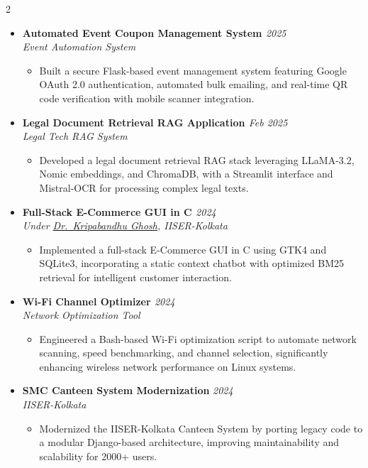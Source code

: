 \documentclass[a4paper,10pt]{article}
\newcommand{\resumeProject}[4]{
    \item\small{
        \textbf{#1} \hfill \textit{#2}\\
        \textit{#3}\\
        \begin{itemize}[leftmargin=1.5em,label=\textbullet,nosep,itemsep=0.5pt]
            #4
        \end{itemize}
    }\vspace{2pt}
}
\begin{document}
{\begin{multicols}{2}
\begin{itemize}[leftmargin=*,label={},itemsep=4pt]
     
    \resumeProject{Automated Event Coupon Management System \href{https://github.com/Shuvam-Banerji-Seal/Automated-Event-Coupon-Sender-Email-and-Verification-Application}{\faGithub}}{2025}
    {Event Automation System}
    {\item Built a secure Flask-based event management system featuring Google OAuth 2.0 authentication, automated bulk emailing, and real-time QR code verification with mobile scanner integration.}
     
    \resumeProject{Legal Document Retrieval RAG Application \href{https://github.com/Shuvam-Banerji-Seal/CCA-2015-LLM}{\faGithub}}{Feb 2025}
    {Legal Tech RAG System}
    {\item Developed a legal document retrieval RAG stack leveraging LLaMA-3.2, Nomic embeddings, and ChromaDB, with a Streamlit interface and Mistral-OCR for processing complex legal texts.}
     
    \resumeProject{Full-Stack E-Commerce GUI in C \href{https://github.com/Shuvam-Banerji-Seal/CS3101-E-Commerce-App-in-C.git}{\faGithub}}{2024}
    {Under \href{https://www.iiserkol.ac.in/web/en/people/faculty/cds/kripaghosh/}{Dr.\ Kripabandhu Ghosh}, IISER-Kolkata}
    {\item Implemented a full-stack E-Commerce GUI in C using GTK4 and SQLite3, incorporating a static context chatbot with optimized BM25 retrieval for intelligent customer interaction.}
     
    \resumeProject{Wi-Fi Channel Optimizer \href{https://github.com/Shuvam-Banerji-Seal/Wi-Fi-channel-optimizer}{\faGithub}}{2024}
    {Network Optimization Tool}
    {\item Engineered a Bash-based Wi-Fi optimization script to automate network scanning, speed benchmarking, and channel selection, significantly enhancing wireless network performance on Linux systems.}
     
    \resumeProject{SMC Canteen System Modernization}{2024}
    {IISER-Kolkata}
    {\item Modernized the IISER-Kolkata Canteen System by porting legacy code to a modular Django-based architecture, improving maintainability and scalability for 2000+ users.}


\end{itemize}
\end{multicols}}
\end{document}
